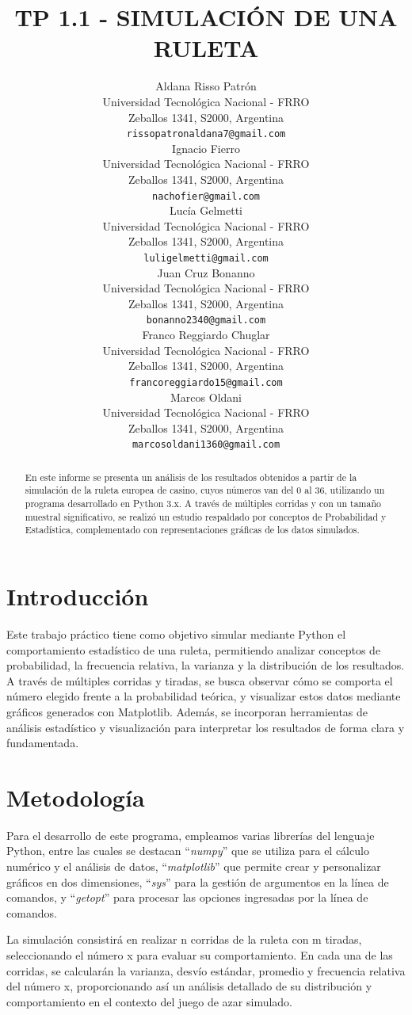 \documentclass{article}
\title{TP 1.1 - SIMULACIÓN DE UNA RULETA}
\author{
 Aldana Risso Patrón \\
  Universidad Tecnológica Nacional - FRRO \\
  Zeballos 1341, S2000, Argentina \\
  \texttt{rissopatronaldana7@gmail.com} \\
   \And
 Ignacio Fierro \\
  Universidad Tecnológica Nacional - FRRO \\
  Zeballos 1341, S2000, Argentina \\
  \texttt{nachofier@gmail.com} \\
  \And
 Lucía Gelmetti \\
  Universidad Tecnológica Nacional - FRRO \\
  Zeballos 1341, S2000, Argentina \\
  \texttt{luligelmetti@gmail.com} \\
  \And
 Juan Cruz Bonanno \\
  Universidad Tecnológica Nacional - FRRO \\
  Zeballos 1341, S2000, Argentina \\
  \texttt{bonanno2340@gmail.com} \\
  \And
 Franco Reggiardo Chuglar \\
  Universidad Tecnológica Nacional - FRRO\\
  Zeballos 1341, S2000, Argentina \\
  \texttt{francoreggiardo15@gmail.com} \\
  \And
 Marcos Oldani \\
  Universidad Tecnológica Nacional - FRRO \\
  Zeballos 1341, S2000, Argentina \\
  \texttt{marcosoldani1360@gmail.com} \\
}
\begin{document}
\maketitle
\begin{abstract}
En este informe se presenta un análisis de los resultados obtenidos a partir de la simulación de la ruleta europea de casino, cuyos números van del 0 al 36, utilizando un programa desarrollado en Python 3.x. A través de múltiples corridas y con un tamaño muestral significativo, se realizó un estudio respaldado por conceptos de Probabilidad y Estadística, complementado con representaciones gráficas de los datos simulados. 
\end{abstract}

\section{Introducción}
Este trabajo práctico tiene como objetivo simular mediante Python el comportamiento estadístico de una ruleta, permitiendo analizar conceptos de probabilidad, la frecuencia relativa, la varianza y la distribución de los resultados.
 A través de múltiples corridas y tiradas, se busca observar cómo se comporta el número elegido frente a la probabilidad teórica, y visualizar estos datos mediante gráficos generados con Matplotlib. Además, se incorporan herramientas de análisis estadístico y visualización para interpretar los resultados de forma clara y fundamentada.

\section {Metodología}

\par Para el desarrollo de este programa, empleamos varias librerías del lenguaje Python, entre las cuales se destacan ``\textit{numpy}'' que se utiliza para el cálculo numérico y el análisis de datos, ``\textit{matplotlib}'' que permite crear y personalizar gráficos en dos dimensiones, ``\textit{sys}'' para la gestión de argumentos en la línea de comandos, y ``\textit{getopt}'' para procesar las opciones ingresadas por la línea de comandos. 

\par La simulación consistirá en realizar n corridas de la ruleta con m tiradas, seleccionando el número x para evaluar su comportamiento. En cada una de las corridas, se calcularán la varianza, desvío estándar, promedio y frecuencia relativa del número x, proporcionando así un análisis detallado de su distribución y comportamiento en el contexto del juego de azar simulado.
\end{document}
